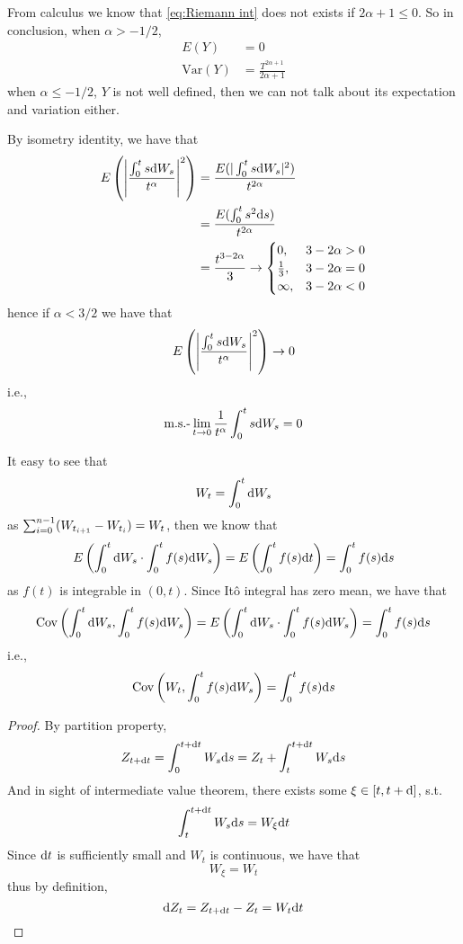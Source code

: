 \documentclass{homework}
\newcommand{\var}{\mathrm{Var}}
\newcommand{\cov}{\mathrm{Cov}}
\begin{document}
\begin{subproblem}[(\arabic*).]
        From calculus we know that \cref{eq:Riemann int} does
        not exists if $2\alpha+1\leq 0$.
        So in conclusion,
        when $\alpha>-1/2$,
        \[\begin{aligned}
            E(Y)&=0\\
            \var(Y)&=\frac{T^{2\alpha+1}}{2\alpha+1}
        \end{aligned}\]
        when $\alpha\leq -1/2$, $Y$ is not well defined, then
        we can not talk about its expectation and variation either.
    \end{subproblem}

    \problem
    By isometry identity, we have that
    \[\begin{aligned}
        E\left(
            \left|\frac{\int_0^ts\mathrm d W_s}{t^\alpha}\right|^2
        \right)&=\frac{E(|\int_0^ts\mathrm d W_s|^2)}{t^{2\alpha}}\\
        &=\frac{E(\int_0^ts^2\mathrm d s)}{t^{2\alpha}}\\
        &=\frac{t^{3-2\alpha}}{3}\to
        \begin{cases}
            0,&3-2\alpha>0\\
            \frac{1}{3},&3-2\alpha=0\\
            \infty,&3-2\alpha<0
        \end{cases}
    \end{aligned}\]
    hence if $\alpha<3/2$ we have that
    \[E\left(
            \left|\frac{\int_0^ts\mathrm d W_s}{t^\alpha}\right|^2
        \right)\to 0\]
    i.e.,
    \[\text{m.s.-}\lim_{t\to0}\frac{1}{t^\alpha}\int_0^ts\mathrm d W_s=0\]

    \problem
    It easy to see that
    \[W_t=\int_0^t\mathrm d W_s\]
    as $\sum_{i=0}^{n-1}(W_{t_{i+1}}-W_{t_i})=W_t$,
    then we know that
    \[E\left(\int_0^t\mathrm d W_s\cdot\int_0^tf(s)\mathrm d W_s\right)
    =E\left(\int_0^tf(s)\mathrm d t\right)=\int_0^tf(s)\mathrm d s\]
    as $f(t)$ is integrable in $(0,t)$.
    Since It\^o integral has zero mean, we have that
    \[\begin{aligned}
        \cov\left(\int_0^t\diff W_s,\int_0^tf(s)\diff W_s\right)
        =E\left(\int_0^t\diff W_s\cdot\int_0^tf(s)\diff W_s\right)
        =\int_0^tf(s)\diff s
    \end{aligned}\]
    i.e.,
    \[\cov\left(W_t,\int_0^tf(s)\diff W_s\right)=
    \int_0^tf(s)\diff s\]

    \problem
    \label{dZt}
    \begin{proof}
        By partition property,
        \[Z_{t+\mathrm d t}=\int_0^{t+\mathrm d t}W_s\mathrm d s
        =Z_t+\int_t^{t+\mathrm d t}W_s\mathrm d s\]
        And in sight of intermediate value theorem, there exists some
        $\xi\in[t,t+\mathrm d]$, s.t.
        \[\int_t^{t+\mathrm d t}W_s\mathrm d s
        =W_\xi\mathrm d t\]
        Since $\mathrm d t$ is sufficiently small and $W_t$ is continuous,
        we have that
        \[W_\xi=W_t\]
        thus by definition,
        \[\mathrm d Z_t=Z_{t+\mathrm d t}-Z_t=W_t\mathrm d t\]
    \end{proof}
\end{document}
